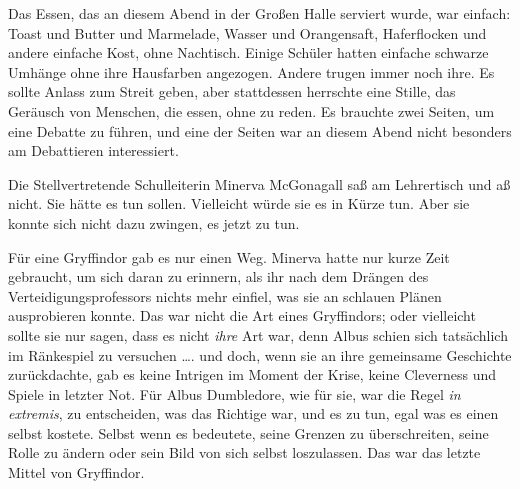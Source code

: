 Das Essen, das an diesem Abend in der Großen Halle serviert wurde, war einfach: Toast und Butter und Marmelade, Wasser und Orangensaft, Haferflocken und andere einfache Kost, ohne Nachtisch. Einige Schüler hatten einfache schwarze Umhänge ohne ihre Hausfarben angezogen. Andere trugen immer noch ihre. Es sollte Anlass zum Streit geben, aber stattdessen herrschte eine Stille, das Geräusch von Menschen, die essen, ohne zu reden. Es brauchte zwei Seiten, um eine Debatte zu führen, und eine der Seiten war an diesem Abend nicht besonders am Debattieren interessiert.

Die Stellvertretende Schulleiterin Minerva McGonagall saß am Lehrertisch und aß nicht. Sie hätte es tun sollen. Vielleicht würde sie es in Kürze tun. Aber sie konnte sich nicht dazu zwingen, es jetzt zu tun.

Für eine Gryffindor gab es nur einen Weg. Minerva hatte nur kurze Zeit gebraucht, um sich daran zu erinnern, als ihr nach dem Drängen des Verteidigungsprofessors nichts mehr einfiel, was sie an schlauen Plänen ausprobieren konnte. Das war nicht die Art eines Gryffindors; oder vielleicht sollte sie nur sagen, dass es nicht \emph{ihre} Art war, denn Albus schien sich tatsächlich im Ränkespiel zu versuchen …. und doch, wenn sie an ihre gemeinsame Geschichte zurückdachte, gab es keine Intrigen im Moment der Krise, keine Cleverness und Spiele in letzter Not. Für Albus Dumbledore, wie für sie, war die Regel \emph{in extremis}, zu entscheiden, was das Richtige war, und es zu tun, egal was es einen selbst kostete. Selbst wenn es bedeutete, seine Grenzen zu überschreiten, seine Rolle zu ändern oder sein Bild von sich selbst loszulassen. Das war das letzte Mittel von Gryffindor.

